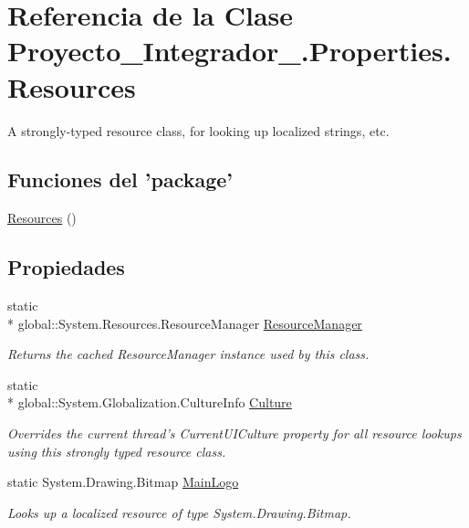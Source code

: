 \hypertarget{class_proyecto___integrador__3_1_1_properties_1_1_resources}{\section{Referencia de la Clase Proyecto\-\_\-\-Integrador\-\_.\-Properties.\-Resources}
\label{class_proyecto___integrador__3_1_1_properties_1_1_resources}
}


A strongly-\/typed resource class, for looking up localized strings, etc.  


\subsection*{Funciones del 'package'}
\begin{DoxyCompactItemize}
\item 
\hyperlink{class_proyecto___integrador__3_1_1_properties_1_1_resources_a443283bd073394b3c478469cd745551a}{Resources} ()
\end{DoxyCompactItemize}
\subsection*{Propiedades}
\begin{DoxyCompactItemize}
\item 
static \\*
global\-::\-System.\-Resources.\-Resource\-Manager \hyperlink{class_proyecto___integrador__3_1_1_properties_1_1_resources_a1b372445ca4c7c8e887fec68ab63ac40}{Resource\-Manager}
\begin{DoxyCompactList}\small\item\em Returns the cached Resource\-Manager instance used by this class. \end{DoxyCompactList}\item 
static \\*
global\-::\-System.\-Globalization.\-Culture\-Info \hyperlink{class_proyecto___integrador__3_1_1_properties_1_1_resources_a421bcb61c1d793352db976854d00c18f}{Culture}
\begin{DoxyCompactList}\small\item\em Overrides the current thread's Current\-U\-I\-Culture property for all resource lookups using this strongly typed resource class. \end{DoxyCompactList}\item 
static System.\-Drawing.\-Bitmap \hyperlink{class_proyecto___integrador__3_1_1_properties_1_1_resources_a0db6781e266a9081ff4ac23d713ea0c1}{Main\-Logo}
\begin{DoxyCompactList}\small\item\em Looks up a localized resource of type System.\-Drawing.\-Bitmap. \end{DoxyCompactList}\end{DoxyCompactItemize}
